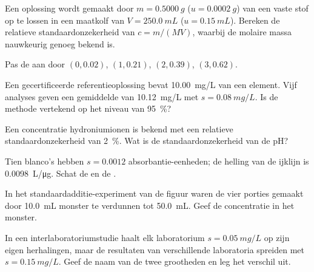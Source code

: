 \begin{exercise}[$\star$]\label{exo:b2:measurement-statistics:3}
Een oplossing wordt gemaakt door $m = \qty{0.5000}{g}$ ($u = \qty{0.0002}{g}$) van een vaste stof op te lossen in een maatkolf van
$V = \qty{250.0}{mL}$ ($u = \qty{0.15}{mL}$). Bereken de relatieve standaardonzekerheid van $c = m/(MV)$,
waarbij de molaire massa nauwkeurig genoeg bekend is.
\end{exercise}

\begin{exercise}[$\star$]\label{exo:b2:measurement-statistics:4}
Pas de  aan door $(0, 0.02)$, $(1, 0.21)$, $(2, 0.39)$, $(3, 0.62)$.
\end{exercise}

\begin{exercise}[$\star\star$]\label{exo:b2:measurement-statistics:5}
Een gecertificeerde referentieoplossing bevat \qty{10.00}{mg/L} van een element. Vijf analyses geven een gemiddelde van
\qty{10.12}{mg/L} met $s = \qty{0.08}{mg/L}$. Is de methode vertekend op het niveau van 95~\%?
\end{exercise}

\begin{exercise}[$\star\star$]\label{exo:b2:measurement-statistics:6}
Een concentratie hydroniumionen is bekend met een relatieve standaardonzekerheid van 2~\%. Wat is de
standaardonzekerheid van de pH?
\end{exercise}

\begin{exercise}[$\star\star$]\label{exo:b2:measurement-statistics:7}
Tien blanco's hebben $s = 0.0012$ absorbantie-eenheden; de helling van de ijklijn is \qty{0.0098}{L/\micro g}.
Schat de  en de .
\end{exercise}

\begin{exercise}[$\star\star$]\label{exo:b2:measurement-statistics:8}
In het standaardadditie-experiment van de figuur waren de vier porties gemaakt door
\qty{10.0}{mL} monster te verdunnen tot \qty{50.0}{mL}. Geef de concentratie in het monster.
\end{exercise}

\begin{exercise}[$\star\star$]\label{exo:b2:measurement-statistics:9}
In een interlaboratoriumstudie haalt elk laboratorium $s = \qty{0.05}{mg/L}$ op zijn eigen herhalingen, maar
de resultaten van verschillende laboratoria spreiden met $s = \qty{0.15}{mg/L}$. Geef de naam van de twee grootheden en
leg het verschil uit.
\end{exercise}

